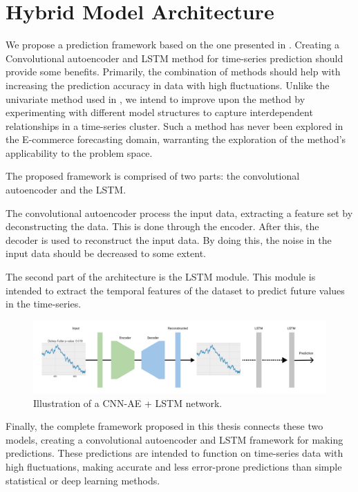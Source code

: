 \section{Hybrid Model Architecture}
\label{section:Architecture:Model}

We propose a prediction framework based on the one presented in \cite{Zhao2019}.
Creating a Convolutional autoencoder and LSTM method for time-series prediction should provide some benefits.
Primarily, the combination of methods should help with increasing the prediction accuracy in data with high fluctuations.
Unlike the univariate method used in \cite{Zhao2019},
we intend to improve upon the method by experimenting with different model structures to capture interdependent relationships in a time-series cluster.
Such a method has never been explored in the E-commerce forecasting domain, warranting the exploration of the method's applicability to the problem space.

The proposed framework is comprised of two parts: the convolutional autoencoder and the LSTM.

The convolutional autoencoder process the input data, extracting a feature set by deconstructing the data.
This is done through the encoder. After this, the decoder is used to reconstruct the input data.
By doing this, the noise in the input data should be decreased to some extent.

The second part of the architecture is the LSTM module.
This module is intended to extract the temporal features of the dataset
to predict future values in the time-series.

\begin{figure}[h!]
  \centering
  \includegraphics[width=\textwidth]{./figs/illustrations/CNN-AE-LSTM.png}
  \hfill
  \caption{Illustration of a CNN-AE + LSTM network.}
  \label{fig:cnn-ae+lstm-network}
\end{figure}

Finally, the complete framework proposed in this thesis connects these two models,
creating a convolutional autoencoder and LSTM framework for making predictions.
These predictions are intended to function on time-series data with high fluctuations,
making accurate and less error-prone predictions than simple statistical or deep learning methods.


